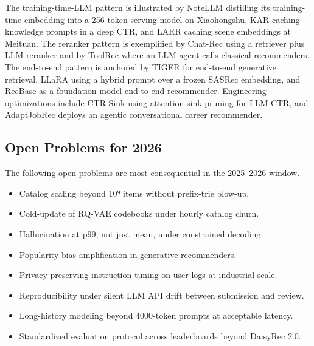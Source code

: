 \documentclass{article}
\begin{document}
The training-time-LLM pattern is illustrated by NoteLLM \citep{zhang2024textlikeencodingof} distilling its training-time embedding into a 256-token serving model on Xiaohongshu, KAR \citep{xi2024towardsopenworldre} caching knowledge prompts in a deep CTR, and LARR \citep{wan2024larrlargelanguagem} caching scene embeddings at Meituan. The reranker pattern is exemplified by Chat-Rec \citep{gao2023chatrectowardsinte} using a retriever plus LLM reranker and by ToolRec \citep{zhao2024recommendersystems} where an LLM agent calls classical recommenders. The end-to-end pattern is anchored by TIGER \citep{rajput2023recommendersystems} for end-to-end generative retrieval, LLaRA \citep{liao2024llaralargelanguage} using a hybrid prompt over a frozen SASRec embedding, and RecBase \citep{zhou2025recbasegenerativef} as a foundation-model end-to-end recommender. Engineering optimizations include CTR-Sink \citep{li2025grefergraphretriev} using attention-sink pruning for LLM-CTR, and AdaptJobRec \citep{wang2025knowledgegraphretr} deploys an agentic conversational career recommender.

\subsection{Open Problems for 2026}\label{open-problems-for-2026}

The following open problems are most consequential in the 2025--2026 window.

\begin{itemize}

\item
  Catalog scaling beyond 10⁹ items without prefix-trie blow-up.
\item
  Cold-update of RQ-VAE codebooks under hourly catalog churn.
\item
  Hallucination at p99, not just mean, under constrained decoding.
\item
  Popularity-bias amplification in generative recommenders.
\item
  Privacy-preserving instruction tuning on user logs at industrial scale.
\item
  Reproducibility under silent LLM API drift between submission and review.
\item
  Long-history modeling beyond 4000-token prompts at acceptable latency.
\item
  Standardized evaluation protocol across leaderboards beyond DaisyRec 2.0.
\end{itemize}
\end{document}
